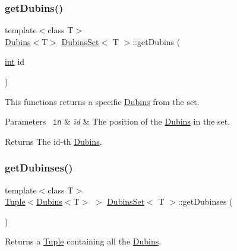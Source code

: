 \subsubsection{\texorpdfstring{getDubins()}{getDubins()}}
{\footnotesize\ttfamily template$<$class T$>$ \\
\mbox{\hyperlink{class_dubins}{Dubins}}$<$T$>$ \mbox{\hyperlink{class_dubins_set}{Dubins\+Set}}$<$ T $>$\+::get\+Dubins (\begin{DoxyParamCaption}\item[{\mbox{\hyperlink{draw_8hh_aa620a13339ac3a1177c86edc549fda9b}{int}}}]{id }\end{DoxyParamCaption})\hspace{0.3cm}{\ttfamily [inline]}}

This functions returns a specific {\ttfamily \mbox{\hyperlink{class_dubins}{Dubins}}} from the set. 
\begin{DoxyParams}[1]{Parameters}
\mbox{\texttt{ in}}  & {\em id} & The position of the {\ttfamily \mbox{\hyperlink{class_dubins}{Dubins}}} in the set. \\
\hline
\end{DoxyParams}
\begin{DoxyReturn}{Returns}
The id-\/th {\ttfamily \mbox{\hyperlink{class_dubins}{Dubins}}}. 
\end{DoxyReturn}
\mbox{\label{class_dubins_set_a2d0216573331d2ca6bf36ea213c4d434}} 
\subsubsection{\texorpdfstring{getDubinses()}{getDubinses()}}
{\footnotesize\ttfamily template$<$class T$>$ \\
\mbox{\hyperlink{class_tuple}{Tuple}}$<$\mbox{\hyperlink{class_dubins}{Dubins}}$<$T$>$ $>$ \mbox{\hyperlink{class_dubins_set}{Dubins\+Set}}$<$ T $>$\+::get\+Dubinses (\begin{DoxyParamCaption}{ }\end{DoxyParamCaption})\hspace{0.3cm}{\ttfamily [inline]}}



Returns a {\ttfamily \mbox{\hyperlink{class_tuple}{Tuple}}} containing all the {\ttfamily \mbox{\hyperlink{class_dubins}{Dubins}}}. 

